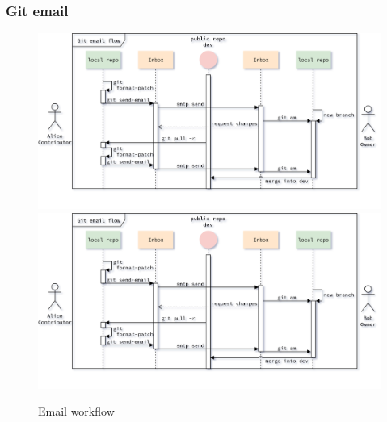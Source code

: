 \begin{frame}[noframenumbering]
    \frametitle{Git email}
    \addtocounter{page}{-1}
    \begin{figure}
        \begin{center}
            {
                \includegraphics[height=0.7\textheight,keepaspectratio]{./images/EmailWorkflow_ApplyAndMerge.png}
            }
            {
                \includegraphics[height=0.75\textheight,keepaspectratio]{./images/EmailWorkflow_ApplyAndMerge.png}
            }
            \caption{Email workflow}
        \end{center}
    \end{figure}
\end{frame}

